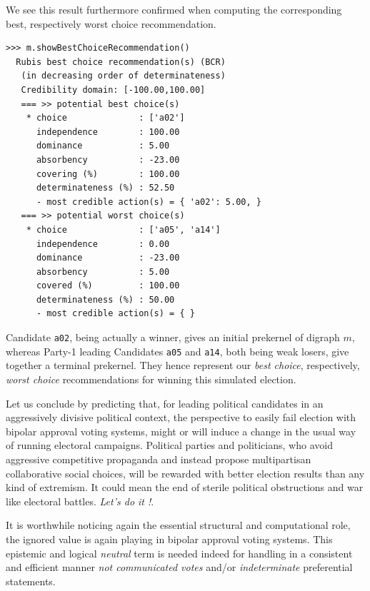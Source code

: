 We see this result furthermore confirmed when computing the corresponding best, respectively worst choice recommendation.    
\begin{lstlisting}
>>> m.showBestChoiceRecommendation()
  Rubis best choice recommendation(s) (BCR)
   (in decreasing order of determinateness)   
   Credibility domain: [-100.00,100.00]
   === >> potential best choice(s)
    * choice              : ['a02']
      independence        : 100.00
      dominance           : 5.00
      absorbency          : -23.00
      covering (%)        : 100.00
      determinateness (%) : 52.50
      - most credible action(s) = { 'a02': 5.00, }
   === >> potential worst choice(s) 
    * choice              : ['a05', 'a14']
      independence        : 0.00
      dominance           : -23.00
      absorbency          : 5.00
      covered (%)         : 100.00
      determinateness (%) : 50.00
      - most credible action(s) = { }
\end{lstlisting}
Candidate \texttt{a02}, being actually a \Condorcet winner, gives an initial prekernel of digraph $m$, whereas Party-1 leading Candidates \texttt{a05} and \texttt{a14}, both being weak \Condorcet losers, give together a terminal prekernel. They hence represent our \emph{best choice}, respectively, \emph{worst choice} recommendations for winning this simulated election.

Let us conclude by predicting that, for leading political candidates in an aggressively divisive political context, the perspective to easily fail election with bipolar approval voting systems, might or will induce a change in the usual way of running electoral campaigns. Political parties and politicians, who avoid aggressive competitive propaganda and instead propose multipartisan collaborative social choices, will be rewarded with better election results than any kind of extremism. It could mean the end of sterile political obstructions and war like electoral battles. \emph{Let's do it !}.

It is worthwhile noticing again the essential structural and computational role, the ignored value is again playing in bipolar approval voting systems. This epistemic and logical \emph{neutral} term is needed indeed for handling in a consistent and efficient manner \emph{not communicated votes} and/or \emph{indeterminate} preferential statements.
 
\clearpage
%


